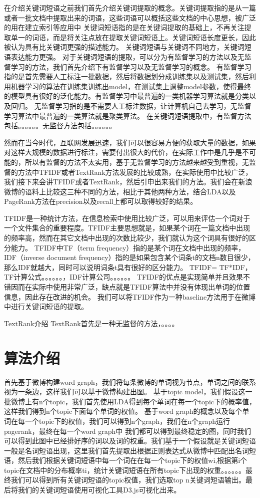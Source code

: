 \documentclass[master]{njuthesis}
\begin{document}
在介绍关键词短语之前我们首先介绍关键词提取的概念。关键词提取指的是从一篇或者一批文档中提取出来的词语，这些词语可以概括这些文档的中心思想，被广泛的用在建立索引等应用中
关键词短语指的是在关键词提取的基础上，不再关注提取单一的词语，而是将关注点放在提取关键词短语上。关键词短语长度更长，因此被认为具有比关键词更强的描述能力。
关键词短语与关键词不同地方，关键词短语表达能力更强。
对于关键词短语的提取，可以分为有监督学习的方法以及无监督学习的方法，我们首先介绍下有监督学习以及无监督学习的概念。
有监督学习指的是首先需要人工标注一批数据，然后将数据划分成训练集以及测试集，然后利用机器学习的算法在训练集训练出model，在测试集上调整model参数，使得最终的模型具有很好的泛化能力。有监督学习中最普遍的一类机器学习算法就是分类以及回归。
无监督学习指的是不需要人工标注数据，让计算机自己去学习，无监督学习算法中最普遍的一类算法就是聚类算法。
在关键词短语提取中，有监督方法包括。。。。。。无监督方法包括。。。。。。

然而在当今时代，互联网发展迅速，我们可以很容易方便的获取大量的数据，如果对这样大规模的数据进行标注，需要付出很大的代价，在实际工作中是几乎是不可能的，所以有监督的方法不太实用，基于无监督学习的方法越来越受到重视，无监督的方法中TFIDF或者TextRank方法发展的比较成熟，在实际使用中比较广泛，我们接下来会讲TFIDF或者TextRank，然后引申出来我们的方法。我们会在新浪微博的语料上比较这三种不同的方法，相比于其他两种方法，结合LDA以及PageRank方法在precision以及recall上都可以取得较好的结果。

TFIDF是一种统计方法，在信息检索中使用比较广泛，可以用来评估一个词对于一个文件集合的重要程度。TFIDF主要思想就是，如果某个词在一篇文档中出现的频率高，然而在其它文档中出现的次数比较少，我们就认为这个词具有很好的区分能力。
TFIDF中TF（term frequency）指的是某个词在文档中出现的频率，IDF（inverse document frequency）指的是如果包含某个词条t的文档n数目很少，那么IDF就越大，同时可以说明词条t具有很好的区分能力。
TFIDF= TF*IDF，TF计算公式。。。。。。，IDF计算公司。。。。。。
TFIDF的优点是实现简单并且效果不错因而在实际中使用非常广泛，缺点就是TFIDF算法中并没有体现出单词的位置信息，因此存在改进的机会。
我们可以将TFIDF作为一种baseline方法用于在微博中进行关键词短语的提取。

TextRank介绍
TextRank首先是一种无监督的方法，。。。。

\section{算法介绍}

首先基于微博构建word graph，我们将每条微博的单词视为节点，单词之间的联系视为一条边，这样我们可以基于微博构建出图。
基于topic model，我们假设这一批微博上有n个topic，我们首先使用LDA得到每个单词在每一个topic下的概率值，这样我们得到n个topic下面每个单词的权值。
基于word graph的概念以及每个单词在每一个topic下的权值，我们可以得到n个graph，我们在n个graph运行pagerank，最终在每一个word graph中 我们都可以得到最终稳定的图，同时我们可以得到此图中已经排好序的词以及词的权重。我们基于一个假设就是关键词短语一般是名词短语出现，这里我们首先提取出根据正则表达式从微博中匹配出名词短语，然后我们根据关键词短语中每一个词在在每一个topic下的权值wi,根据第i个topic在文档中的分布概率ti，统计关键词短语在所有topic下出现的权重。。。。。。最终我们可以得到所有关键词短语的topic权值，我们选取top n关键词短语输出。最后将我们的关键词短语使用可视化工具D3.js可视化出来。
\end{document}
